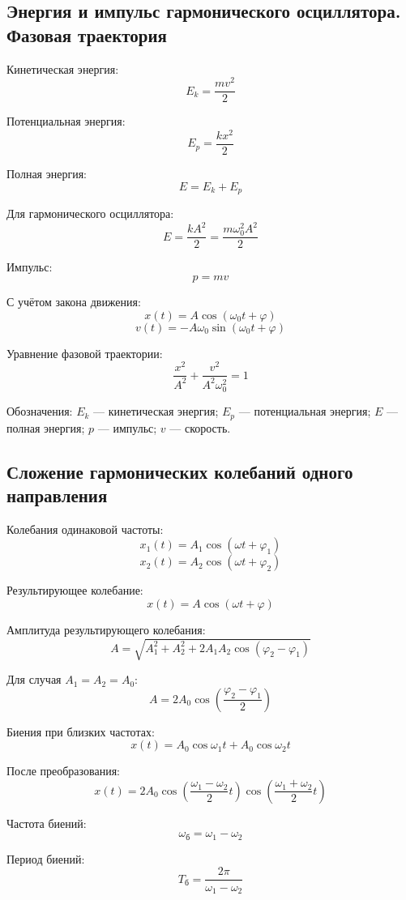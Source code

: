 \documentclass[a4paper,12pt]{article}
\begin{document}
\subsection{Энергия и импульс гармонического осциллятора. Фазовая траектория}

Кинетическая энергия:
\[
E_k = \frac{mv^2}{2}
\]

Потенциальная энергия:
\[
E_p = \frac{kx^2}{2}
\]

Полная энергия:
\[
E = E_k + E_p
\]

Для гармонического осциллятора:
\[
E = \frac{kA^2}{2} = \frac{m\omega_0^2 A^2}{2}
\]

Импульс:
\[
p = mv
\]

С учётом закона движения:
\[
x\left(t\right) = A \cos\left(\omega_0 t + \varphi\right)
\]
\[
v\left(t\right) = -A\omega_0 \sin\left(\omega_0 t + \varphi\right)
\]

Уравнение фазовой траектории:
\[
\frac{x^2}{A^2} + \frac{v^2}{A^2\omega_0^2} = 1
\]

Обозначения:  
\(E_k\) — кинетическая энергия;  
\(E_p\) — потенциальная энергия;  
\(E\) — полная энергия;  
\(p\) — импульс;  
\(v\) — скорость.

\subsection{Сложение гармонических колебаний одного направления}

Колебания одинаковой частоты:
\[
x_1\left(t\right) = A_1 \cos\left(\omega t + \varphi_1\right)
\]
\[
x_2\left(t\right) = A_2 \cos\left(\omega t + \varphi_2\right)
\]

Результирующее колебание:
\[
x\left(t\right) = A \cos\left(\omega t + \varphi\right)
\]

Амплитуда результирующего колебания:
\[
A = \sqrt{A_1^2 + A_2^2 + 2A_1A_2\cos\left(\varphi_2 - \varphi_1\right)}
\]

Для случая \(A_1 = A_2 = A_0\):
\[
A = 2A_0 \cos\left(\frac{\varphi_2 - \varphi_1}{2}\right)
\]

Биения при близких частотах:
\[
x\left(t\right) = A_0 \cos\omega_1 t + A_0 \cos\omega_2 t
\]

После преобразования:
\[
x\left(t\right) = 2A_0 \cos\left(\frac{\omega_1 - \omega_2}{2}t\right)
\cos\left(\frac{\omega_1 + \omega_2}{2}t\right)
\]

Частота биений:
\[
\omega_{\text{б}} = \omega_1 - \omega_2
\]

Период биений:
\[
T_{\text{б}} = \frac{2\pi}{\omega_1 - \omega_2}
\]
\end{document}
